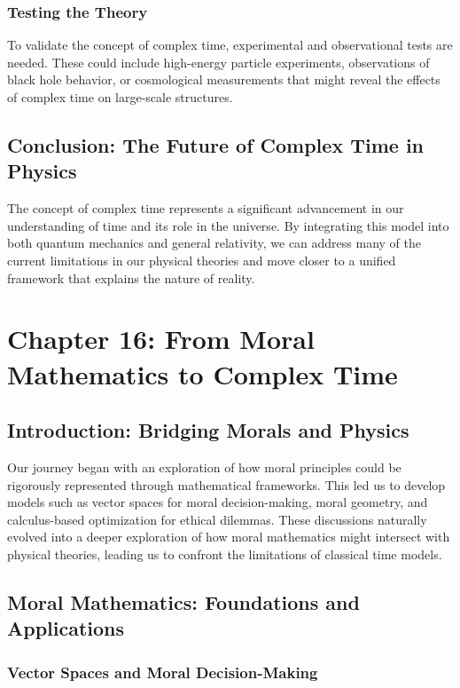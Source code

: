 \documentclass{article}
\begin{document}
\subsubsection{Testing the Theory}

To validate the concept of complex time, experimental and observational tests are needed. These could include high-energy particle experiments, observations of black hole behavior, or cosmological measurements that might reveal the effects of complex time on large-scale structures.

\subsection{Conclusion: The Future of Complex Time in Physics}

The concept of complex time represents a significant advancement in our understanding of time and its role in the universe. By integrating this model into both quantum mechanics and general relativity, we can address many of the current limitations in our physical theories and move closer to a unified framework that explains the nature of reality.


\section{Chapter 16: From Moral Mathematics to Complex Time}

\subsection{Introduction: Bridging Morals and Physics}

Our journey began with an exploration of how moral principles could be rigorously represented through mathematical frameworks. This led us to develop models such as vector spaces for moral decision-making, moral geometry, and calculus-based optimization for ethical dilemmas. These discussions naturally evolved into a deeper exploration of how moral mathematics might intersect with physical theories, leading us to confront the limitations of classical time models.

\subsection{Moral Mathematics: Foundations and Applications}

\subsubsection{Vector Spaces and Moral Decision-Making}
\end{document}
